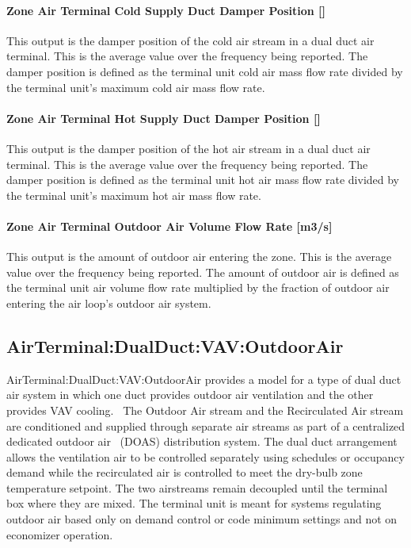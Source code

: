 \paragraph{Zone Air Terminal Cold Supply Duct Damper Position {[]}}\label{zone-air-terminal-cold-supply-duct-damper-position-1}

This output is the damper position of the cold air stream in a dual duct air terminal. This is the average value over the frequency being reported. The damper position is defined as the terminal unit cold air mass flow rate divided by the terminal unit's maximum cold air mass flow rate.

\paragraph{Zone Air Terminal Hot Supply Duct Damper Position {[]}}\label{zone-air-terminal-hot-supply-duct-damper-position-1}

This output is the damper position of the hot air stream in a dual duct air terminal. This is the average value over the frequency being reported. The damper position is defined as the terminal unit hot air mass flow rate divided by the terminal unit's maximum hot air mass flow rate.

\paragraph{Zone Air Terminal Outdoor Air Volume Flow Rate {[}m3/s{]}}

This output is the amount of outdoor air entering the zone. This is the average value over the frequency being reported. The amount of outdoor air is defined as the terminal unit air volume flow rate multiplied by the fraction of outdoor air entering the air loop's outdoor air system.

\subsection{AirTerminal:DualDuct:VAV:OutdoorAir}\label{airterminaldualductvavoutdoorair}

AirTerminal:DualDuct:VAV:OutdoorAir provides a model for a type of dual duct air system in which one duct provides outdoor air ventilation and the other provides VAV cooling.~ The Outdoor Air stream and the Recirculated Air stream are conditioned and supplied through separate air streams as part of a centralized dedicated outdoor air~ (DOAS) distribution system. The dual duct arrangement allows the ventilation air to be controlled separately using schedules or occupancy demand while the recirculated air is controlled to meet the dry-bulb zone temperature setpoint. The two airstreams remain decoupled until the terminal box where they are mixed. The terminal unit is meant for systems regulating outdoor air based only on demand control or code minimum settings and not on economizer operation.

